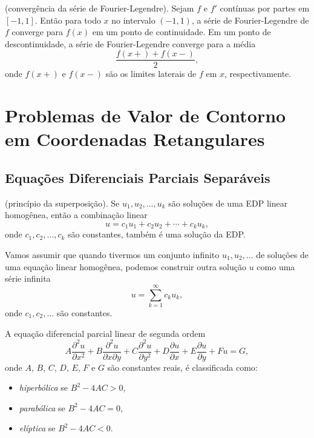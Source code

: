 \documentclass{article}
\begin{document}
\begin{prop} (convergência da série de Fourier-Legendre).
    Sejam \(f\) e \(f'\) contínuas por partes em \([-1,1]\). Então para todo \(x\) no intervalo \((-1,1)\), a série de Fourier-Legendre de \(f\) converge para \(f(x)\) em um ponto de continuidade. Em um ponto de descontinuidade, a série de Fourier-Legendre converge para a média
    \begin{equation*}
        \frac{f(x+) + f(x-)}{2},
    \end{equation*}
    \noindent onde \(f(x+)\) e \(f(x-)\) são os limites laterais de \(f\) em \(x\), respectivamente.
\end{prop}

\section{Problemas de Valor de Contorno em Coordenadas Retangulares}

\subsection{Equações Diferenciais Parciais Separáveis}

\begin{thm} (princípio da superposição).
    Se \(u_1, u_2, \ldots, u_k\) são soluções de uma EDP linear homogênea, então a combinação linear
    \begin{equation}
        u = c_1 u_1 + c_2 u_2 + \cdots + c_k u_k,
    \end{equation}
    \noindent onde \(c_1, c_2, \ldots, c_k\) são constantes, também é uma solução da EDP.
\end{thm}

\begin{rem}
    Vamos assumir que quando tivermos um conjunto infinito \(u_1, u_2, \ldots\) de soluções de uma equação linear homogênea, podemos construir outra solução \(u\) como uma série infinita
    \begin{equation}
        u = \sum_{k=1}^{\infty} c_k u_k,
    \end{equation}
    \noindent onde \(c_1, c_2, \ldots\) são constantes.
\end{rem}

\begin{defn}
    A equação diferencial parcial linear de segunda ordem
    \begin{equation}
        A \frac{\partial^2 u}{\partial x^2} + B \frac{\partial^2 u}{\partial x \partial y} + C \frac{\partial^2 u}{\partial y^2} + D \frac{\partial u}{\partial x} + E \frac{\partial u}{\partial y} + F u = G,
    \end{equation}
    \noindent onde \(A\), \(B\), \(C\), \(D\), \(E\), \(F\) e \(G\) são constantes reais, é classificada como:
    \begin{itemize}
        \item \emph{hiperbólica} se \(B^2 - 4AC > 0\),
        \item \emph{parabólica} se \(B^2 - 4AC = 0\),
        \item \emph{elíptica} se \(B^2 - 4AC < 0\).
    \end{itemize}
\end{defn}
\end{document}
